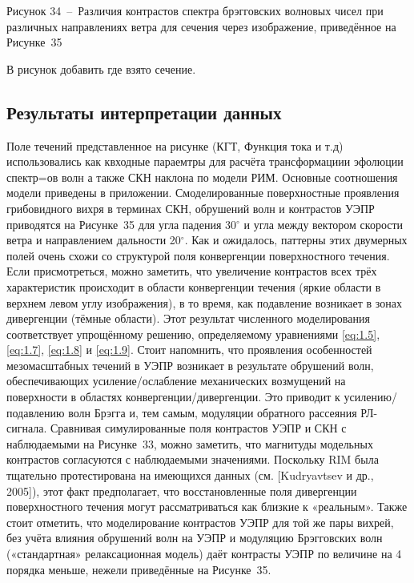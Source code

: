 Рисунок 34~--~Различия контрастов спектра брэгговских волновых чисел при различных направлениях ветра для сечения через изображение, приведённое на Рисунке~35

В рисунок добавить где взято сечение.



\label{1.23)}\label{ZEqnNum538621} \label{ZEqnNum419022}\label{ZEqnNum135284}\label{ZEqnNum272976}



\subsection{Результаты интерпретации данных} \label{sec:3.3.1}


Поле течений представленное на рисунке (КГТ, Функция тока и т.д) использовались как квходные параемтры для расчёта трансформациии эфолюции спектр=ов волн а также СКН наклона по модели РИМ. Основные соотношения модели приведены в приложении. Смоделированные поверхностные проявления грибовидного вихря в терминах СКН, обрушений волн и контрастов УЭПР приводятся на Рисунке~35 для угла падения 30${}^\circ$ и угла между вектором скорости ветра и направлением дальности 20${}^\circ$. Как и ожидалось, паттерны этих двумерных полей очень схожи со структурой поля конвергенции поверхностного течения. Если присмотреться, можно заметить, что увеличение контрастов всех трёх характеристик происходит в области конвергенции течения (яркие области в верхнем левом углу изображения), в то время, как подавление возникает в зонах дивергенции (тёмные области). Этот результат численного моделирования соответствует упрощённому решению, определяемому уравнениями \eqref{eq:1.5}, \eqref{eq:1.7}, \eqref{eq:1.8} и \eqref{eq:1.9}. Стоит напомнить, что проявления особенностей мезомасштабных течений в УЭПР возникает в результате обрушений волн, обеспечивающих усиление/ослабление механических возмущений на поверхности в областях конвергенции/дивергенции. Это приводит к усилению/подавлению волн Брэгга и, тем самым, модуляции обратного рассеяния РЛ-сигнала. Сравнивая симулированные поля контрастов УЭПР и СКН с наблюдаемыми на Рисунке~33, можно заметить, что магнитуды модельных контрастов согласуются с наблюдаемыми значениями. Поскольку RIM была тщательно протестирована на имеющихся данных (см. [Kudryavtsev и др., 2005]), этот факт предполагает, что восстановленные поля дивергенции поверхностного течения могут рассматриваться как близкие к «реальным». Также стоит отметить, что моделирование контрастов УЭПР для той же пары вихрей, без учёта влияния обрушений волн на УЭПР и модуляцию Брэгговских волн («стандартная» релаксационная модель) даёт контрасты УЭПР по величине на 4 порядка меньше, нежели приведённые на Рисунке~35.



